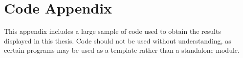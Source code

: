 \chapter{Code Appendix}
This appendix includes a large sample of code used to obtain the results displayed in this thesis.  Code should not be used without understanding, as certain programs may be used as a template rather than a standalone module.
